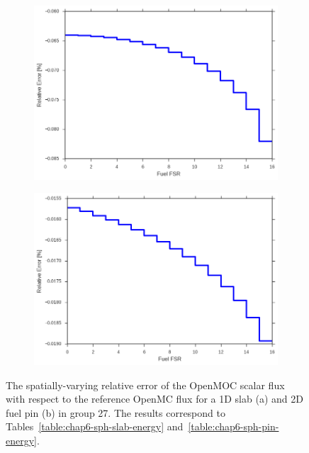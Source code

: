 \begin{figure}[h!]
\begin{subfigure}{.9\textwidth}
  \centering
  \includegraphics[width=0.9\linewidth]{figures/sph/slab/rel-err-fuel-fsrs}
  \caption{}
\end{subfigure}
\begin{subfigure}{.9\textwidth}
  \centering
  \includegraphics[width=0.9\linewidth]{figures/sph/pin-cell/rel-err-fuel-fsrs}
  \caption{}
\end{subfigure}
\caption[Flux relative error by FSR w/ SPH]{The spatially-varying relative error of the OpenMOC scalar flux with respect to the reference OpenMC flux for a 1D slab (a) and 2D fuel pin (b) in group 27. The results correspond to Tables~\ref{table:chap6-sph-slab-energy} and~\ref{table:chap6-sph-pin-energy}.}
\label{fig:chap6-rel-err-space}
\end{figure}

